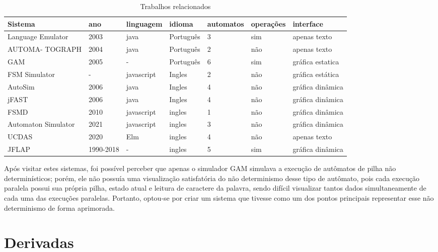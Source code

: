 \renewcommand{\arraystretch}{1.5}
\begin{table}
    \centering
    \begin{tabularx}{\textwidth}{|X|X|X|X|X|X|X|}
        \hline
        \rowcolor{lightgray}
         Sistema& ano&  linguagem&  idioma&  automatos&  operações& interface\\\hline
         Language Emulator&  2003&  java&  Português&  3&  sim& apenas texto\\\hline
         AUTOMA- TOGRAPH&  2004&  java&  Português&  2&  não& apenas texto\\\hline
         GAM&  2005&  -&  Português&  6&  sim& gráfica estatica\\\hline
         FSM Simulator&  -&  javascript&  Ingles&  2&  não& gráfica estática\\\hline
         AutoSim&  2006&  java&  Ingles&  4&  não& gráfica dinâmica\\\hline
         jFAST&  2006&  java&  Ingles& 4 &  não& gráfica dinâmica\\\hline
         FSMD&  2010&  javascript&  ingles&  1&  não& gráfica dinâmica\\\hline
         Automaton Simulator&  2021&  javascript&  ingles&  3&  não& gráfica dinâmica\\\hline
         UCDAS&  2020&  Elm&  ingles&  4&  não& apenas texto\\\hline
         JFLAP&  1990-2018&  -&  ingles&  5&  sim& gráfica dinâmica\\\hline
    \end{tabularx}
    \caption{Trabalhos relacionados}
    \label{tab:comparação de sistemas}
\end{table}

Após visitar estes sistemas, foi possível perceber que apenas o simulador GAM simulava a execução de autômatos de pilha não determinísticos; porém, ele não possuía uma visualização satisfatória do não determinismo desse tipo de autômato, pois cada execução paralela possui sua própria pilha, estado atual e leitura de caractere da palavra, sendo difícil visualizar tantos dados simultaneamente de cada uma das execuções paralelas. Portanto, optou-se por criar um sistema que tivesse como um dos pontos principais representar esse não determinismo de forma aprimorada.
 

\section{Derivadas}

